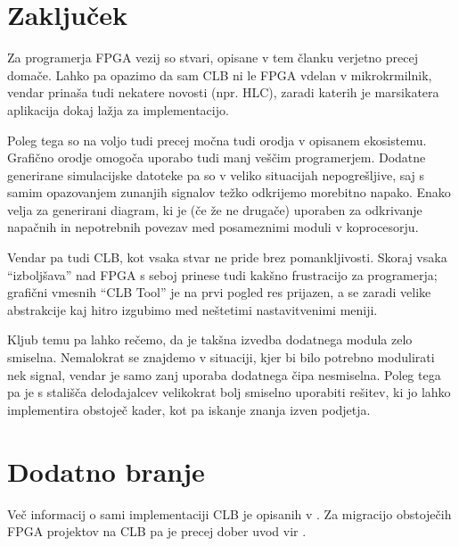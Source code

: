 \documentclass[a4paper]{article}
\begin{document}
\begin{sloppypar}
\section{Zaključek}
Za programerja FPGA vezij so stvari, opisane v tem članku verjetno precej
domače. Lahko pa opazimo da sam CLB ni le FPGA vdelan v mikrokrmilnik, vendar
prinaša tudi nekatere novosti (npr. HLC), zaradi katerih je marsikatera
aplikacija dokaj lažja za implementacijo.

Poleg tega so na voljo tudi precej močna tudi orodja v opisanem ekosistemu.
Grafično orodje omogoča uporabo tudi manj veščim programerjem. Dodatne
generirane simulacijske datoteke pa so v veliko situacijah nepogrešljive, saj s
samim opazovanjem zunanjih signalov težko odkrijemo morebitno napako. Enako
velja za generirani diagram, ki je (če že ne drugače) uporaben za odkrivanje
napačnih in nepotrebnih povezav med posameznimi moduli v koprocesorju.

Vendar pa tudi CLB, kot vsaka stvar ne pride brez pomankljivosti. Skoraj vsaka
``izboljšava'' nad FPGA s seboj prinese tudi kakšno frustracijo za programerja;
grafični vmesnih ``CLB Tool'' je na prvi pogled res prijazen, a se zaradi
velike abstrakcije kaj hitro izgubimo med neštetimi nastavitvenimi meniji.

Kljub temu pa lahko rečemo, da je takšna izvedba dodatnega modula zelo
smiselna. Nemalokrat se znajdemo v situaciji, kjer bi bilo potrebno modulirati
nek signal, vendar je samo zanj uporaba dodatnega čipa nesmiselna. Poleg tega
pa je s stališča delodajalcev velikokrat bolj smiselno uporabiti rešitev, ki jo
lahko implementira obstoječ kader, kot pa iskanje znanja izven podjetja.

\section{Dodatno branje}
Več informacij o sami implementaciji CLB je opisanih v \cite{clb-designing}. Za
migracijo obstoječih FPGA projektov na CLB pa je precej dober uvod vir
\cite{fpga-to-clb}.

\printbibliography



\end{sloppypar}
\end{document}
